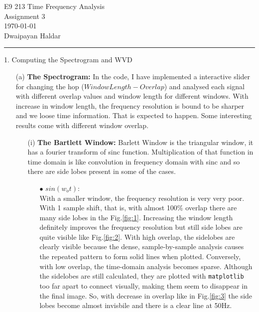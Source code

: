 \documentclass[12pt,a4paper,onecolumn]{exam}
\newcommand{\questionheader}[1]{%
  \begin{tcolorbox}[
    enhanced,
    colback=black,
    coltext=white,
    boxrule=0pt,              
    fontupper=\Large\bfseries, 
    arc=4mm                   
  ]
  #1 
  \end{tcolorbox}%
}
\begin{document}
\begingroup  
    \centering
    \LARGE E9 213 Time Frequency Analysis\\
    \LARGE Assignment 3\\[0.5em]
    \large \today\\[0.5em]
    \large Dwaipayan Haldar\par
\endgroup
\noindent\rule{\textwidth}{0.5pt}
\printanswers
\renewcommand{\solutiontitle}{\noindent\textbf{Ans:}\enspace}

\questionheader{1. Computing the Spectrogram and WVD}
\begin{solution}
  \begin{itemize}
    \item[(a)] \textbf{The Spectrogram:} 
    In the code, I have implemented a interactive slider for changing the hop ($Window Length - Overlap$) and analysed each signal with different      overlap values and window length for different windows. With increase in window length, the frequency resolution is bound to be sharper and we loose time information. That is expected to happen. Some interesting results come with different window overlap. 
    \begin{itemize}
      \item[(i)] \textbf{The Bartlett Window:}
      Barlett Window is the triangular window, it has a fourier transform of sinc function. Multiplication of that function in time domain is like convolution in frequency domain with sinc and so there are side lobes present in some of the cases. 
      \begin{itemize}

        \item[$\bullet$] $sin(w_ot)$:\\
        With a smaller window, the frequency resolution is very very poor. With 1 sample shift, that is, with almost 100\% overlap there are many side lobes in the Fig.\ref{fig:1}. Increasing the window length definitely improves the frequency resolution but still side lobes are quite visible like Fig.\ref{fig:2}. With high overlap, the sidelobes are clearly visible because the dense, sample-by-sample analysis causes the repeated pattern to form solid lines when plotted. Conversely, with low overlap, the time-domain analysis becomes sparse. Although the sidelobes are still calculated, they are plotted with \verb|matplotlib| too far apart to connect visually, making them seem to disappear in the final image. So, with decrease in overlap like in Fig.\ref{fig:3} the side lobes become almost invisbile and there is a clear line at 50Hz.
      

\end{itemize}
\end{itemize}
\end{itemize}
\end{solution}
\end{document}

